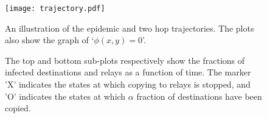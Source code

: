 \documentclass[10pt,journal,letterpaper]{IEEEtran}
\begin{document}
\begin{figure}[t]
\centering
\texttt{[image: trajectory.pdf]}
\caption{An illustration of the  epidemic and two hop trajectories.
 The plots also show the graph of  `$\phi(x,y) = 0$'.}
\label{fig:epi-twohop-trajectory}
\end{figure}

\begin{figure}[t]
\centering
{}
\caption{The top and bottom sub-plots respectively show the fractions of infected
destinations and relays as a function of time. The marker 'X' indicates the states at
which copying to relays is stopped, and 'O' indicates the states at
which $\alpha$ fraction of destinations have been copied.}
\label{fig:epi-twohop-evolution}
\end{figure}
\end{document}
